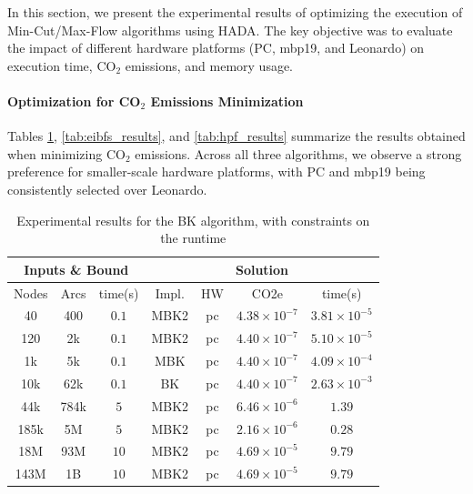 \documentclass[a4paper,singleside,12pt]{report} %
\begin{document}
In this section, we present the experimental results of optimizing the execution of Min-Cut/Max-Flow algorithms using HADA. The key objective was to evaluate the impact of different
hardware platforms (PC, mbp19, and Leonardo) on execution time, CO$_2$ emissions, and memory usage.

\paragraph{Optimization for CO$_2$ Emissions Minimization}

Tables \ref{tab:bk_results}, \ref{tab:eibfs_results}, and \ref{tab:hpf_results} summarize the results obtained when minimizing CO$_2$ emissions. Across all three algorithms, we observe
a strong preference for smaller-scale hardware platforms, with PC and mbp19 being consistently selected over Leonardo.

\begin{table}[h!]
    \centering
    \begin{tabular}{|ccc|cccc|}
        \hline
        \multicolumn{3}{|c|}{Inputs \& Bound} & \multicolumn{4}{c|}{Solution} \\
        \hline
        Nodes & Arcs & time(s) & Impl. & HW & CO2e & time(s) \\
        \hline
        40 & 400 & $0.1$ & MBK2 & pc & $4.38 \times 10^{-7}$ & $3.81 \times 10^{-5}$ \\
        120 & 2k & $0.1$ & MBK2 & pc & $4.40 \times 10^{-7}$ & $5.10 \times 10^{-5}$ \\
        1k & 5k & $0.1$ & MBK & pc & $4.40 \times 10^{-7}$ & $4.09 \times 10^{-4}$ \\
        10k & 62k & $0.1$ & BK & pc & $4.40 \times 10^{-7}$ & $2.63 \times 10^{-3}$ \\
        44k & 784k & $5$ & MBK2 & pc & $6.46 \times 10^{-6}$ & $1.39$ \\
        185k & 5M & $5$ & MBK2 & pc & $2.16 \times 10^{-6}$ & $0.28$ \\
        18M & 93M & $10$ & MBK2 & pc & $4.69 \times 10^{-5}$& $9.79$ \\
        143M & 1B & $10$ & MBK2 & pc & $4.69 \times 10^{-5}$ & $9.79$ \\
        \hline
    \end{tabular}
    \caption{Experimental results for the BK algorithm, with constraints on the runtime}
    \label{tab:bk_results}
\end{table}
\end{document}
